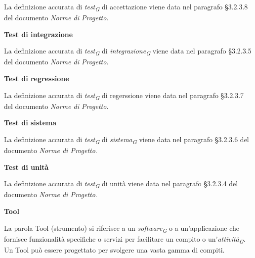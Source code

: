 \documentclass{article}
\begin{document}
\vspace{0.1cm}

La definizione accurata di \textit{test}\textsubscript{\textit{G}} di accettazione viene data nel paragrafo §3.2.3.8 del documento \textit{Norme di Progetto}.

\vspace{0.4cm}

\textbf{Test di integrazione}

\vspace{0.1cm}

La definizione accurata di \textit{test}\textsubscript{\textit{G}} di \textit{integrazione}\textsubscript{\textit{G}} viene data nel paragrafo §3.2.3.5 del documento \textit{Norme di Progetto}.

\vspace{0.4cm}

\textbf{Test di regressione}

\vspace{0.1cm}

La definizione accurata di \textit{test}\textsubscript{\textit{G}} di regerssione viene data nel paragrafo §3.2.3.7 del documento \textit{Norme di Progetto}.

\vspace{0.4cm}

\textbf{Test di sistema} 

\vspace{0.1cm}

La definizione accurata di \textit{test}\textsubscript{\textit{G}} di \textit{sistema}\textsubscript{\textit{G}} viene data nel paragrafo §3.2.3.6 del documento \textit{Norme di Progetto}.

\vspace{0.4cm}

\textbf{Test di unità}

\vspace{0.1cm}

La definizione accurata di \textit{test}\textsubscript{\textit{G}} di unità viene data nel paragrafo §3.2.3.4 del documento \textit{Norme di Progetto}.

\vspace{0.4cm}

\textbf{Tool}

\vspace{0.1cm}

La parola Tool (strumento) si riferisce a un \textit{software}\textsubscript{\textit{G}} o a un'applicazione che fornisce funzionalità specifiche o servizi per facilitare un compito o un'\textit{attività}\textsubscript{\textit{G}}. Un Tool può essere progettato per svolgere una vasta gamma di compiti.
\end{document}
